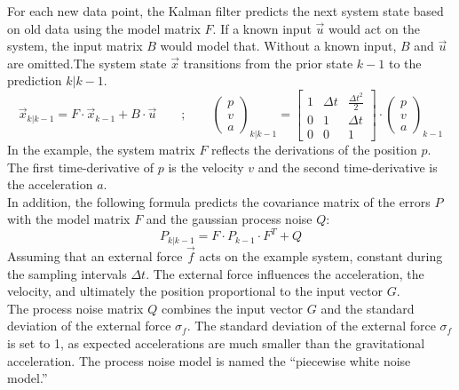 For each new data point, the Kalman filter predicts the next system state based on old data using the model matrix $F$. If a known input $\vec{u}$ would act on the system, the input matrix $B$ would model that. Without a known input, $B$ and $\vec{u}$ are omitted.The system state $\vec{x}$ transitions from the prior state $k-1$ to the prediction $k|k-1$. \\
\begin{equation*}
    \vec{x}_{k|k-1} = 
    F
    \cdot
    \vec{x}_{k-1}
    +
    B
    \cdot
    \vec{u} \qquad ; \qquad
    \begin{pmatrix}
        p  \\
        v  \\
        a 
    \end{pmatrix}_{k|k-1} = 
    \begin{bmatrix}
        1 & \Delta t & \frac{\Delta t^{2}}{2} \\
        0 & 1 & \Delta t \\
        0 & 0 & 1
    \end{bmatrix}
    \cdot
    \begin{pmatrix}
        p  \\
        v  \\
        a 
    \end{pmatrix}_{k-1}    
\end{equation*}
In the example, the system matrix $F$ reflects the derivations of the position $p$. The first time-derivative of $p$ is the velocity $v$ and the second time-derivative is the acceleration $a$.\\
In addition, the following formula predicts the covariance matrix of the errors $P$ with the model matrix $F$ and the gaussian process noise $Q$:
\begin{equation*}
    P_{k|k-1} = 
    F
    \cdot
    P_{k-1}
    \cdot
    F^{T}
    +
    Q
\end{equation*}
Assuming that an external force $\vec{f}$ acts on the example system, constant during the sampling intervals $\Delta t$.  The external force influences the acceleration, the velocity, and ultimately the position proportional to the input vector $G$.\\ 
The process noise matrix $Q$ combines the input vector $G$ and the standard deviation of the external force $\sigma_{f}$. The standard deviation of the external force $\sigma_{f}$ is set to 1, as expected accelerations are much smaller than the gravitational acceleration. The process noise model is named the “piecewise white noise model.”
